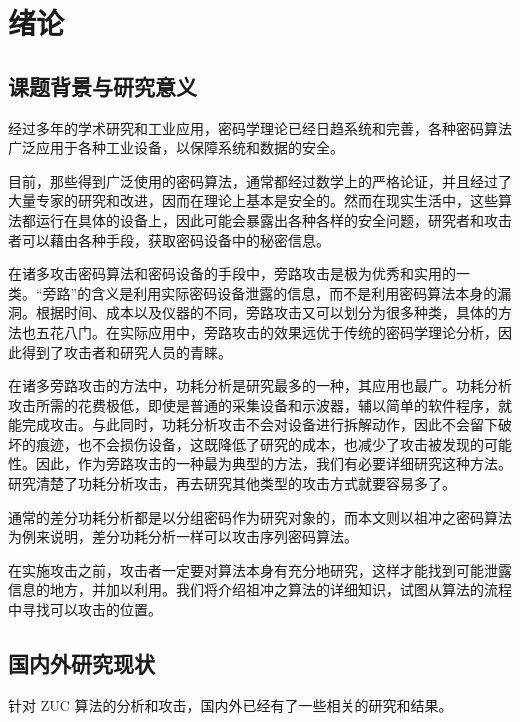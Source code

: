 

\chapter{绪论}

\label{chap:intro}

\section{课题背景与研究意义}

经过多年的学术研究和工业应用，密码学理论已经日趋系统和完善，各种密码算法广泛应用于各种工业设备，以保障系统和数据的安全。

目前，那些得到广泛使用的密码算法，通常都经过数学上的严格论证，并且经过了大量专家的研究和改进，因而在理论上基本是安全的。然而在现实生活中，这些算法都运行在具体的设备上，因此可能会暴露出各种各样的安全问题，研究者和攻击者可以藉由各种手段，获取密码设备中的秘密信息。

在诸多攻击密码算法和密码设备的手段中，旁路攻击是极为优秀和实用的一类。“旁路”的含义是利用实际密码设备泄露的信息，而不是利用密码算法本身的漏洞。根据时间、成本以及仪器的不同，旁路攻击又可以划分为很多种类，具体的方法也五花八门。在实际应用中，旁路攻击的效果远优于传统的密码学理论分析，因此得到了攻击者和研究人员的青睐。

在诸多旁路攻击的方法中，功耗分析是研究最多的一种，其应用也最广。功耗分析攻击所需的花费极低，即使是普通的采集设备和示波器，辅以简单的软件程序，就能完成攻击。与此同时，功耗分析攻击不会对设备进行拆解动作，因此不会留下破坏的痕迹，也不会损伤设备，这既降低了研究的成本，也减少了攻击被发现的可能性。因此，作为旁路攻击的一种最为典型的方法，我们有必要详细研究这种方法。研究清楚了功耗分析攻击，再去研究其他类型的攻击方式就要容易多了。

通常的差分功耗分析都是以分组密码作为研究对象的，而本文则以祖冲之密码算法为例来说明，差分功耗分析一样可以攻击序列密码算法。

在实施攻击之前，攻击者一定要对算法本身有充分地研究，这样才能找到可能泄露信息的地方，并加以利用。我们将介绍祖冲之算法的详细知识，试图从算法的流程中寻找可以攻击的位置。

\section{国内外研究现状}

针对 ZUC 算法的分析和攻击，国内外已经有了一些相关的研究和结果。

